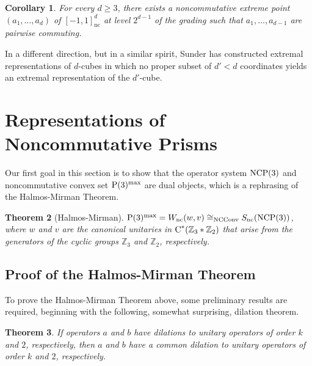 \documentclass{amsart}
\newtheorem{theorem}{Theorem}[section]
\newtheorem{corollary}[theorem]{Corollary}
\theoremstyle{definition}
\theoremstyle{remark}
\newcommand\cstar{{\textrm C}^*}                              %
\numberwithin{equation}{section}
\begin{document}
\begin{corollary} For every $d\geq 3$, there exists a noncommutative extreme point $(a_1,\dots,a_d)$
of $[-1,1]^d_{\textrm{nc}}$ at level $2^{d-1}$ of the grading such that 
$a_1,\dots, a_{d-1}$ are pairwise commuting.
\end{corollary}

In a different direction, but in a similar spirit, Sunder \cite{sunder1988}
has constructed extremal representations of $d$-cubes in which no proper subset
of $d'<d$ coordinates yields an extremal representation of the $d'$-cube.
 
\section{Representations of Noncommutative Prisms}

Our first goal in this section is to show that the operator system $\mbox{\textrm{NCP}}(3)$ and noncommutative convex set $\mbox{\textrm P}(3)^{\textrm{max}}$
are dual objects, which is a rephrasing of the Halmos-Mirman Theorem.

\begin{theorem}[Halmos-Mirman]\label{halmos-mirman2}
$\mbox{\textrm P}(3)^{\textrm{max}} = W_{\textrm{nc}}(w,v) \cong_{{\textrm{NCConv}}} S_{\textrm{nc}}(\mbox{\textrm{NCP}}(3))$,
where $w$ and $v$ are the canonical unitaries in $\cstar(\mathbb Z_3 * \mathbb Z_2)$ that arise from the generators 
of the cyclic groups $\mathbb Z_3$ and $\mathbb Z_2$, respectively. 
\end{theorem}

\subsection{Proof of the Halmos-Mirman Theorem}\label{deferred proofs}

To prove the Halmos-Mirman Theorem above, some preliminary results are required, beginning with the
following, somewhat surprising, dilation theorem.

\begin{theorem}\label{joint dilation}
If operators $a$ and $b$ have dilations to unitary operators of order $k$ and $2$, respectively, then
$a$ and $b$ have a common dilation to unitary operators of order $k$ and $2$, respectively.
\end{theorem}
\end{document}
